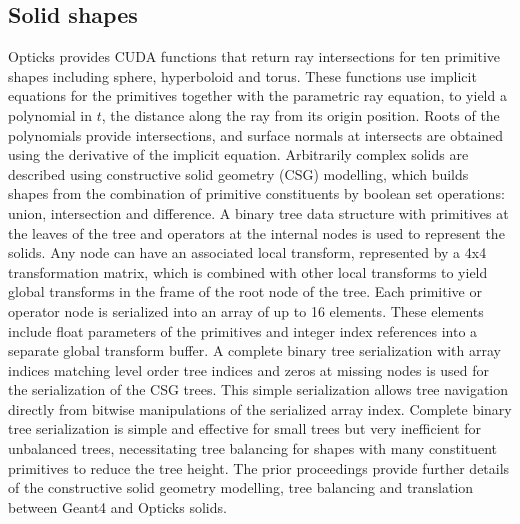 \documentclass{webofc}
\begin{document}
\subsection{Solid shapes}%
%
Opticks provides CUDA functions that return ray intersections for ten primitive shapes including sphere, hyperboloid and torus.
These functions use implicit equations for the primitives together with 
the parametric ray equation, to yield a polynomial in $t$, the distance along the ray from its origin position. 
Roots of the polynomials provide intersections, and surface normals at intersects are obtained
using the derivative of the implicit equation.
%
Arbitrarily complex solids are described using constructive solid geometry (CSG) modelling, 
which builds shapes from the combination of primitive constituents by boolean set operations: union, intersection and difference.
A binary tree data structure with primitives at the leaves of the tree and operators at the internal nodes is used
to represent the solids. Any node can have an associated local transform, represented by a 4x4 transformation matrix, which 
is combined with other local transforms to yield global transforms in the frame of the root node of the tree.
%
Each primitive or operator node is serialized into an array of up to 16 elements. 
These elements include float parameters of the primitives and integer index references 
into a separate global transform buffer. 
A complete binary tree serialization with array indices matching level order tree indices
and zeros at missing nodes is used for the serialization of the CSG trees. This simple 
serialization allows tree navigation directly from bitwise manipulations of the serialized array index.
%
Complete binary tree serialization is simple and effective for small trees but very inefficient 
for unbalanced trees, necessitating tree balancing for shapes with many constituent primitives 
to reduce the tree height. 
The prior proceedings\cite{chep2018} provide further details of the constructive solid geometry modelling, 
tree balancing and translation between Geant4 and Opticks solids.

%
%
%
\end{document}
